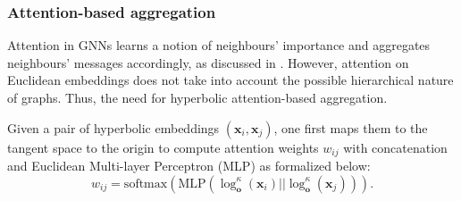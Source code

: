 \subsubsection{Attention-based aggregation}
Attention in GNNs learns a notion of neighbours' importance and aggregates neighbours' messages accordingly, as discussed in . However, attention on Euclidean embeddings does not take into account the possible hierarchical nature of graphs. Thus, the need for hyperbolic attention-based aggregation. 

Given a pair of hyperbolic embeddings $(\mathbf{x}_i, \mathbf{x}_j)$, one first maps them to the tangent space to the origin to compute attention weights $w_{ij}$ with concatenation and Euclidean Multi-layer Perceptron (MLP) as formalized below:
\begin{equation*}
    w_{ij} = \text{softmax}\left(\text{MLP}\left(\log_{\mathbf{o}}^\kappa(\mathbf{x}_i) \left|\right| \log_{\mathbf{o}}^\kappa\left(\mathbf{x}_j\right)\right)\right).
\end{equation*}

